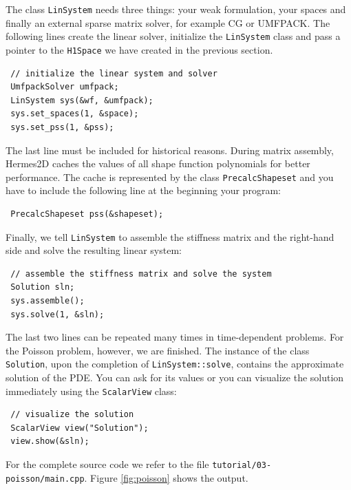 \documentclass[11pt]{article}
\begin{document}
The class {\tt LinSystem} needs three things: your weak formulation, your spaces and
finally an external sparse matrix solver, for example CG or UMFPACK. The following lines
create the linear solver, initialize the {\tt LinSystem} class and pass a pointer to
the {\tt H1Space} we have created in the previous section.

\begin{lstlisting}
 // initialize the linear system and solver
 UmfpackSolver umfpack;
 LinSystem sys(&wf, &umfpack);
 sys.set_spaces(1, &space);
 sys.set_pss(1, &pss);
\end{lstlisting}

The last line must be included for historical reasons. During matrix assembly,
Hermes2D caches the values of all shape function polynomials for better performance.
The cache is represented by the class {\tt PrecalcShapeset} and you have to
include the following line at the beginning your program:

\begin{lstlisting}
 PrecalcShapeset pss(&shapeset);
\end{lstlisting}

Finally, we tell {\tt LinSystem} to assemble the stiffness matrix and the right-hand
side and solve the resulting linear system: 

\begin{lstlisting}
 // assemble the stiffness matrix and solve the system
 Solution sln;
 sys.assemble();
 sys.solve(1, &sln);
\end{lstlisting}

The last two lines can be repeated many times in time-dependent problems. For
the Poisson problem, however,
we are finished. The instance of the class {\tt Solution}, upon the
completion of {\tt LinSystem::solve}, contains the approximate solution of
the PDE. You can ask for its values %
or you can visualize the solution immediately using the {\tt ScalarView} class:

\begin{lstlisting}
 // visualize the solution
 ScalarView view("Solution");
 view.show(&sln);
\end{lstlisting}

For the complete source code we refer to the file {\tt tutorial/03-poisson/main.cpp}.
Figure \ref{fig:poisson} shows the output.
\end{document}
